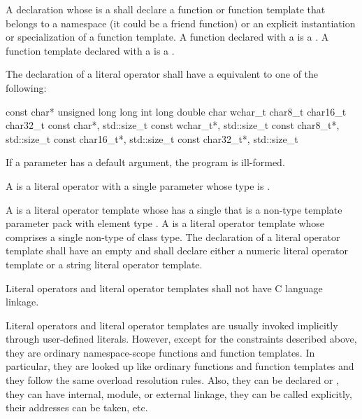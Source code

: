 \pnum
A declaration whose  is a
 shall declare a function or function template
that belongs to a namespace (it could be a friend function) or
an explicit instantiation or specialization of a function template.
A function declared with a  is a . A function template declared with a 
is a .

\pnum
The declaration of a literal operator shall have a
 equivalent to one of the following:
\begin{codeblock}
const char*
unsigned long long int
long double
char
wchar_t
char8_t
char16_t
char32_t
const char*, std::size_t
const wchar_t*, std::size_t
const char8_t*, std::size_t
const char16_t*, std::size_t
const char32_t*, std::size_t
\end{codeblock}

If a parameter has a default argument, the program is
ill-formed.

\pnum
A  is a literal operator with a single parameter
whose type is .

\pnum
A 
is a literal operator template whose 
has a single 
that is a non-type template parameter pack
with element type .
A 
is a literal operator template whose 
comprises
a single non-type  of class type.
The declaration of a literal operator template
shall have an empty 
and shall declare either a numeric literal operator template
or a string literal operator template.

\pnum
Literal operators and literal operator templates shall not have C language linkage.

\pnum
\begin{note}
Literal operators and literal operator templates are usually invoked
implicitly through user-defined literals. However, except for
the constraints described above, they are ordinary namespace-scope functions and
function templates. In particular, they are looked up like ordinary functions
and function templates and they follow the same overload resolution rules. Also,
they can be declared  or ,
they can have internal, module, or external linkage,
they can be called explicitly, their addresses can be
taken, etc.
\end{note}

